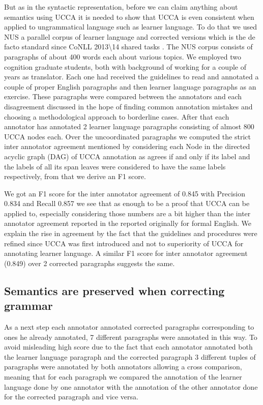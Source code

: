 \documentclass[english]{article}
\begin{document}
But as in the syntactic representation, before we can claim anything
about semantics using UCCA it is needed to show that UCCA is even
consistent when applied to ungrammatical language such as learner
language. To do that we used NUS\cite{dahlmeier2013building} a parallel
corpus of learner language and corrected versions which is the de
facto standard since CoNLL 2013\textbackslash{}14 shared tasks \cite{kao2013conll,ng2014conll}.
The NUS corpus consists of paragraphs of about 400 words each about
various topics. We employed two cognition graduate students, both
with background of working for a couple of years as translator. Each
one had received the guidelines to read and annotated a couple of
proper English paragraphs and then learner language paragraphs as
an exercise. These paragraphs were compared between the annotators
and each disagreement discussed in the hope of finding common annotation
mistakes and choosing a methodological approach to borderline cases.
After that each annotator has annotated 2 learner language paragraphs
consisting of almost 800 UCCA nodes each. Over the uncoordinated paragraphs
we computed the strict inter annotator agreement mentioned by \cite{abend2013universal}
considering each Node in the directed acyclic graph (DAG) of UCCA
annotation as agrees if and only if its label and the labels of all
its span leaves were considered to have the same labels respectively,
from that we derive an F1 score. 

We got an F1 score for the inter annotator agreement of 0.845 with
Precision 0.834 and Recall 0.857 we see that as enough to be a proof
that UCCA can be applied to, especially considering those numbers
are a bit higher than the inter annotator agreement reported in the
reported originally for formal English\cite{abend2013universal}.
We explain the rise in agreement by the fact that the guidelines and
procedures were refined since UCCA was first introduced and not to
superiority of UCCA for annotating learner language. A similar F1
score for inter annotator agreement (0.849) over 2 corrected paragraphs
suggests the same.

\subsection{Semantics are preserved when correcting grammar}

As a next step each annotator annotated corrected paragraphs corresponding
to ones he already annotated, 7 different paragraphs were annotated
in this way. To avoid misleading high score due to the fact that each
annotator annotated both the learner language paragraph and the corrected
paragraph 3 different tuples of paragraphs were annotated by both
annotators allowing a cross comparison, meaning that for each paragraph
we compared the annotation of the learner language done by one annotator
with the annotation of the other annotator done for the corrected
paragraph and vice versa. 
\end{document}
